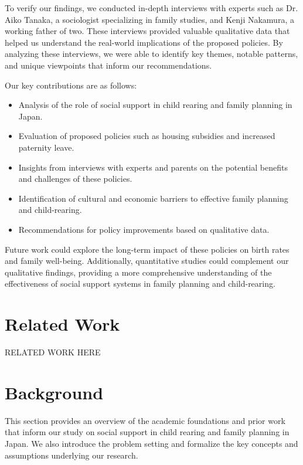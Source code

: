 \documentclass{article} %
\begin{document}
To verify our findings, we conducted in-depth interviews with experts such as Dr. Aiko Tanaka, a sociologist specializing in family studies, and Kenji Nakamura, a working father of two. These interviews provided valuable qualitative data that helped us understand the real-world implications of the proposed policies. By analyzing these interviews, we were able to identify key themes, notable patterns, and unique viewpoints that inform our recommendations.

Our key contributions are as follows:
\begin{itemize}
    \item Analysis of the role of social support in child rearing and family planning in Japan.
    \item Evaluation of proposed policies such as housing subsidies and increased paternity leave.
    \item Insights from interviews with experts and parents on the potential benefits and challenges of these policies.
    \item Identification of cultural and economic barriers to effective family planning and child-rearing.
    \item Recommendations for policy improvements based on qualitative data.
\end{itemize}

Future work could explore the long-term impact of these policies on birth rates and family well-being. Additionally, quantitative studies could complement our qualitative findings, providing a more comprehensive understanding of the effectiveness of social support systems in family planning and child-rearing.

\section{Related Work}
\label{sec:related}
RELATED WORK HERE

\section{Background}
\label{sec:background}

This section provides an overview of the academic foundations and prior work that inform our study on social support in child rearing and family planning in Japan. We also introduce the problem setting and formalize the key concepts and assumptions underlying our research.
\end{document}
